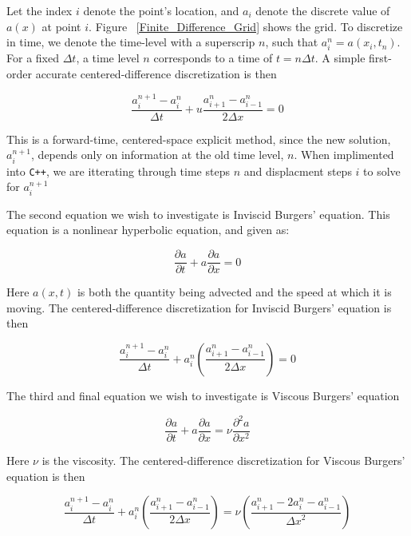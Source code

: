 \documentclass{article}
\begin{document}
Let the index $i$ denote the point's location, and $a_i$ denote the discrete value of $a(x)$ at point $i$. Figure ~\ref{Finite_Difference_Grid} shows the grid. To discretize in time, we denote the time-level with a superscrip $n$, such that $a_i^n = a(x_i, t_n)$. For a fixed $\Delta t$, a time level $n$ corresponds to a time of $t = n \Delta t$. A simple first-order accurate centered-difference discretization is then

\begin{equation}
 \frac{a_i^{n+1} - a_i^n}{\Delta t} + u \frac{a_{i+1}^n - a_{i-1}^n}{2 \Delta x}  = 0
\end{equation}

This is a forward-time, centered-space explicit method, since the new solution, $a_i^{n+1}$, depends only on information at the old time level, $n$. When implimented into \texttt{C++}, we are itterating through time steps $n$ and displacment steps $i$ to solve for $a_i^{n+1} $

The second equation we wish to investigate is Inviscid Burgers’ equation. This equation is a nonlinear hyperbolic equation, and given as:

\begin{equation}
 \frac{\partial a}{\partial t} + a \frac{\partial a}{\partial x} = 0
\end{equation}

Here $a(x,t)$ is both the quantity being advected and the speed at which it is moving. The centered-difference discretization for Inviscid Burgers' equation is then

\begin{equation}
 \frac{a_i^{n+1} - a_i^n}{\Delta t} +  a_i^n ( \frac{a_{i+1}^n - a_{i-1}^n}{2 \Delta x} ) = 0
\end{equation}

The third and final equation we wish to investigate is Viscous Burgers' equation

\begin{equation}
 \frac{\partial a}{\partial t} + a \frac{\partial a}{\partial x} = \nu \frac{\partial ^2 a}{\partial x^2} 
\end{equation}

Here $\nu$ is the viscosity. The centered-difference discretization for Viscous Burgers' equation is then

\begin{equation}
 \frac{a_i^{n+1} - a_i^n}{\Delta t} + a_i^n ( \frac{a_{i+1}^n - a_{i-1}^n}{2 \Delta x} ) = \nu (\frac{a_{i+1}^n - 2a_i^n - a_{i-1}^n}{{\Delta x}^2})
\end{equation}
\end{document}
